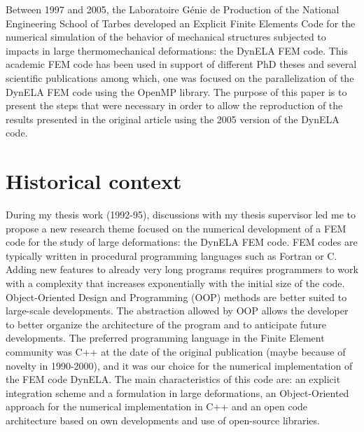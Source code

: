 


Between 1997 and 2005, the Laboratoire G\'enie de Production of the National Engineering School of Tarbes developed an Explicit Finite Elements Code for the numerical simulation of the behavior of mechanical structures subjected to impacts in large thermomechanical deformations: the DynELA FEM code. This academic FEM code has been used in support of different PhD theses and several scientific publications \cite{Pantale:2002,Pantale:2004,Menanteau:2006,Nistor:2007,Nistor:2008} among which, one \cite{Pantale:2005} was focused on the parallelization of the DynELA FEM code using the OpenMP library. The purpose of this paper is to present the steps that were necessary in order to allow the reproduction of the results presented in the original article \cite{Pantale:2005} using the 2005 version of the DynELA code.

\section{Historical context}

During my thesis work (1992-95), discussions with my thesis supervisor led me to propose a new research theme focused on the numerical development of a FEM code for the study of large deformations: the DynELA FEM code. FEM codes are typically written in procedural programming languages such as Fortran or C. Adding new features to already very long programs requires programmers to work with a complexity that increases exponentially with the initial size of the code. Object-Oriented Design and Programming (OOP) methods are better suited to large-scale developments. The abstraction allowed by OOP allows the developer to better organize the architecture of the program and to anticipate future developments. The preferred programming language in the Finite Element community was C++ at the date of the original publication (maybe because of novelty in 1990-2000), and it was our choice for the numerical implementation of the FEM code DynELA. The main characteristics of this code are: an explicit integration scheme and a formulation in large deformations, an Object-Oriented approach for the numerical implementation in C++ and an open code architecture based on own developments and use of open-source libraries.

